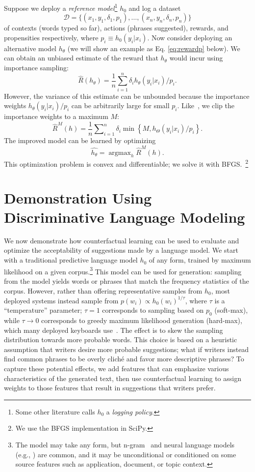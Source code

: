 \documentclass[11pt,letterpaper]{article}
\begin{document}
 Suppose we deploy a \emph{reference model}\footnote{Some other literature calls $h_0$ a \emph{logging policy}.} $h_0$ and log a dataset
$$\mathcal{D}=\{(x_1,y_1,\delta_1,p_1),\ldots,(x_n,y_n,\delta_n,p_n)\}$$ of contexts (words typed so far), actions (phrases suggested), rewards, and propensities respectively, where $p_i\equiv{} h_0(y_i\vert{}x_i)$. Now consider deploying an alternative model $h_\theta$ (we will show an example as Eq. \eqref{eq:rewardp} below). We can obtain an unbiased estimate of the reward that $h_\theta$ would incur using importance sampling:
%
$$\hat{R}(h_\theta) = \frac{1}{n}\sum_{i=1}^{n}\delta_i {h_\theta(y_i\vert{}x_i)}/{p_i}.$$
%
However, the variance of this estimate can be unbounded because the importance weights $h_\theta(y_i\vert{}x_i) / p_i$ can be arbitrarily large for small $p_i$. Like~\citet{ionides2008truncated}, we clip the importance weights to a maximum $M$:
%
$$\hat{R}^M(h) = \frac{1}{n}\sum\nolimits_{i=1}^{n}\delta_i \min\left\{M, {h_\Theta(y_i\vert{}x_i)}/{p_i}\right\}.$$
%
%
%
%
The improved model can be learned by optimizing $$\hat{h_\theta}=\operatorname{argmax}_h \hat{R}^M(h).$$ This optimization problem is convex and differentiable; we solve it with BFGS.~\footnote{We use the BFGS implementation in SciPy. } %

%
%

%

%
%



\section{Demonstration Using Discriminative Language Modeling}

We now demonstrate how counterfactual learning can be used to evaluate and optimize the acceptability of suggestions made by a language model.
We start with a traditional predictive language model $h_0$ of any form, trained by maximum likelihood on a given corpus.\footnote{The model may take any form, but n-gram~\cite{KenLM-Heafield-estimate} and neural language models (e.g., \cite{kim2016character}) are common, and it may be unconditional or conditioned on some source features such as application, document, or topic context.}
This model can be used for generation: sampling from the model yields words or phrases that match the frequency statistics of the corpus.
However, rather than offering representative samples from $h_0$, most deployed systems instead sample from $p(w_i) \propto{} h_0(w_i)^{1/\tau}$, where $\tau$ is a ``temperature'' parameter;  $\tau=1$ corresponds to sampling based on $p_0$ (soft-max), while $\tau\rightarrow0$ corresponds to greedy maximum likelihood generation (hard-max), which many deployed keyboards use~\cite{Quinn2016:CostBenefitSuggestion}. The effect is to skew the sampling distribution towards more probable words.
This choice is based on a heuristic assumption that writers desire more probable suggestions; what if writers instead find common phrases to be overly cliché and favor more descriptive phrases?
To capture these potential effects, we add features that can emphasize various characteristics of the generated text, then use counterfactual learning to assign weights to those features that result in suggestions that writers prefer.
\end{document}
